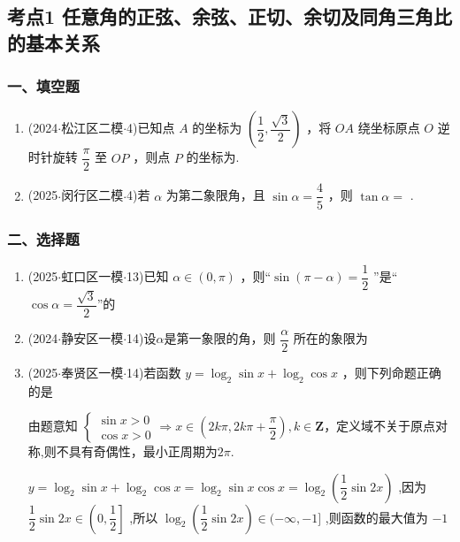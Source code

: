 \subsection*{考点1 任意角的正弦、余弦、正切、余切及同角三角比的基本关系}

\subsubsection*{一、填空题}
\begin{enumerate}
    \item (2024$\cdot$松江区二模$\cdot$4)已知点 $A$ 的坐标为 $\left( {\dfrac{1}{2},\dfrac{\sqrt{3}}{2}}\right)$ ，将 ${OA}$ 绕坐标原点 $O$ 逆时针旋转 $\dfrac{\pi }{2}$ 至 ${OP}$ ，则点 $P$ 的坐标为.
    
    \item (2025$\cdot$闵行区二模$\cdot$4)若 $\alpha$ 为第二象限角，且 $\sin \alpha  = \dfrac{4}{5}$ ，则 $\tan \alpha  =$ .

\end{enumerate}
\subsubsection*{二、选择题}
\begin{enumerate}
    \item (2025$\cdot$虹口区一模$\cdot$13)已知 $\alpha  \in  \left( {0,\pi }\right)$ ，则“$\sin \left( {\pi  - \alpha }\right)  = \dfrac{1}{2}$ ”是“$\cos \alpha  = \dfrac{\sqrt{3}}{2}$”的
    
    \item (2024$\cdot$静安区一模$\cdot$14)设$\alpha$是第一象限的角，则 $\dfrac{\alpha }{2}$ 所在的象限为 

    \item (2025$\cdot$奉贤区一模$\cdot$14)若函数 $y = {\log }_{2}\sin x + {\log }_{2}\cos x$ ，则下列命题正确的是 
    \begin{jieda}
        由题意知 $\left\{  {\begin{array}{l} \sin x > 0 \\  \cos x > 0 \end{array} \Longrightarrow  x \in  \left( {{2k\pi },{2k\pi } + \dfrac{\pi }{2}}\right) ,k \in  \mathbf{Z}}\right.$，定义域不关于原点对称,则不具有奇偶性，最小正周期为$2\pi$.
        
        
        $y = {\log }_{2}\sin x +  {\log }_{2}\cos x = {\log }_{2}\sin x\cos x = {\log }_{2}\left( {\dfrac{1}{2}\sin {2x}}\right)$ ,因为 $\dfrac{1}{2}\sin {2x} \in  \left( {0,\dfrac{1}{2}}\right\rbrack$ ,所以 ${\log }_{2}\left( {\dfrac{1}{2}\sin {2x}}\right)  \in  ( - \infty , - 1\rbrack$ ,则函数的最大值为 $-1$
    \end{jieda}
\end{enumerate}
